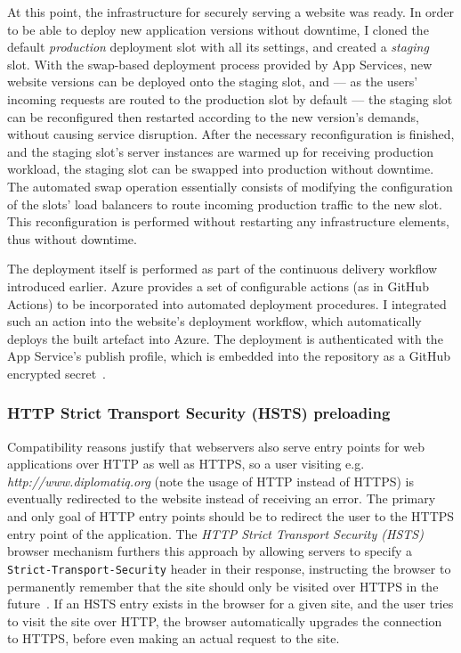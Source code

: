 At this point, the infrastructure for securely serving a website was ready. In order to be able to deploy new application versions without downtime, I cloned the default \emph{production} deployment slot with all its settings, and created a \emph{staging} slot. With the swap-based deployment process provided by App Services, new website versions can be deployed onto the staging slot, and — as the users' incoming requests are routed to the production slot by default — the staging slot can be reconfigured then restarted according to the new version's demands, without causing service disruption. After the necessary reconfiguration is finished, and the staging slot's server instances are warmed up for receiving production workload, the staging slot can be swapped into production without downtime. The automated swap operation essentially consists of modifying the configuration of the slots' load balancers to route incoming production traffic to the new slot. This reconfiguration is performed without restarting any infrastructure elements, thus without downtime.

The deployment itself is performed as part of the continuous delivery workflow introduced earlier. Azure provides a set of configurable actions (as in GitHub Actions) to be incorporated into automated deployment procedures. I integrated such an action into the website's deployment workflow, which automatically deploys the built artefact into Azure. The deployment is authenticated with the App Service's publish profile, which is embedded into the repository as a GitHub encrypted secret~\cite{github-encrypted-secrets}.

\subsubsection{HTTP Strict Transport Security (HSTS) preloading}

Compatibility reasons justify that webservers also serve entry points for web applications over HTTP as well as HTTPS, so a user visiting e.g. \emph{http://www.diplomatiq.org} (note the usage of HTTP instead of HTTPS) is eventually redirected to the website instead of receiving an error. The primary and only goal of HTTP entry points should be to redirect the user to the HTTPS entry point of the application. The \emph{HTTP Strict Transport Security (HSTS)} browser mechanism furthers this approach by allowing servers to specify a \lstinline{Strict-Transport-Security} header in their response, instructing the browser to permanently remember that the site should only be visited over HTTPS in the future~\cite{garron2013state}. If an HSTS entry exists in the browser for a given site, and the user tries to visit the site over HTTP, the browser automatically upgrades the connection to HTTPS, before even making an actual request to the site.

